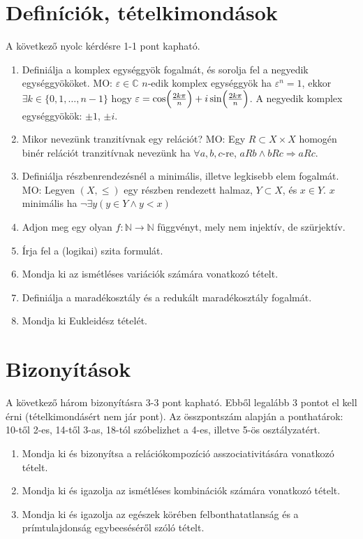 \documentclass[11pt,a4paper]{article}
\begin{document}
\newpage
\section{Definíciók, tételkimondások}
A következő nyolc kérdésre 1-1 pont kapható. 
\begin{enumerate}

\item Definiálja a komplex egységgyök fogalmát, és sorolja fel a
  negyedik egységgyököket.  MO: $\varepsilon\in\mathbb{C}$ $n$-edik
  komplex egység\-gyök ha $\varepsilon^n=1$, ekkor
  $\exists k \in \{ 0,1,\ldots, n-1 \}$ hogy
  $\varepsilon=\cos\Bigl( \frac{2k\pi}{n}\Bigr) +i \sin\Bigl(
  \frac{2k\pi}{n}\Bigr)$. A negyedik komplex egység\-gyökök: $\pm 1$,
  $\pm i$.
\item Mikor nevezünk tranzitívnak egy relációt? MO: Egy
  $R\subset X \times X$ homogén binér relációt tranzitívnak nevezünk
  ha $\forall a,b,c$-re, $aRb \land bRc \Rightarrow aRc$.
\item Definiálja részbenrendezésnél a minimális, illetve legkisebb
  elem fogalmát. MO: Legyen $(X,\le)$ egy részben rendezett halmaz,
  $Y\subset X$, és $x\in Y$. $x$ minimális ha
  $\lnot \exists y ( y\in Y \land y < x)$
\item Adjon meg egy olyan $f\colon \mathbb{N}\to\mathbb{N}$ függvényt, mely nem injektív, de szürjektív.
\item Írja fel a (logikai) szita formulát.
\item Mondja ki az ismétléses variációk számára vonatkozó tételt.
\item Definiálja a maradékosztály és a redukált maradékosztály fogalmát.
\item Mondja ki Eukleidész tételét.



\end{enumerate}

\newpage
\section{Bizonyítások}
A következő három bizonyításra 3-3 pont kapható. Ebből legalább 3 pontot el kell érni (tételkimondásért nem jár pont).
Az összpontszám alapján a ponthatárok: 10-től 2-es, 14-től 3-as, 18-tól szóbelizhet a 4-es, illetve 5-ös osztályzatért.
\begin{enumerate}

\item Mondja ki és bizonyítsa a relációkompozíció asszociativitására vonatkozó tételt.
\item Mondja ki és igazolja az ismétléses kombinációk számára vonatkozó tételt.
\item Mondja ki és igazolja az egészek körében felbonthatatlanság és a prímtulajdonság egybeeséséről szóló tételt.

\end{enumerate}
\end{document}
